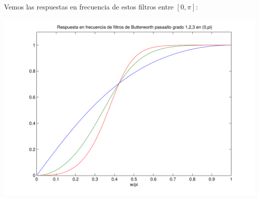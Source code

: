 \documentclass[a4paper]{article}
\begin{document}
{\small

}
Vemos las respuestas en frecuencia de estos filtros entre $[0,\pi]$:

\includegraphics[width=14cm]{img/ej2}
%
\end{document}

